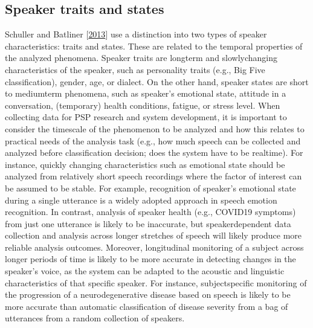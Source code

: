 \documentclass[letterpaper,10pt,english]{jupyterBook}
\begin{document}
\subsection{Speaker traits and states}
\label{\detokenize{Recognition/Paralinguistic_speech_processing:speaker-traits-and-states}}
\sphinxAtStartPar
Schuller and Batliner {[}\hyperlink{cite.References:id8}{2013}{]}
use a distinction into two types of speaker
characteristics: traits and states. These are related to the temporal
properties of the analyzed phenomena. Speaker traits are long\sphinxhyphen{}term and
slowly\sphinxhyphen{}changing characteristics of the speaker, such as personality
traits (e.g., Big Five classification), gender, age, or dialect. On the
other hand, speaker states are short\sphinxhyphen{} to medium\sphinxhyphen{}term phenomena, such as
speaker’s emotional state, attitude in a conversation, (temporary)
health conditions, fatigue, or stress level. When collecting data for
PSP research and system development, it is important to consider the
time\sphinxhyphen{}scale of the phenomenon to be analyzed and how this relates to
practical needs of the analysis task (e.g., how much speech can be
collected and analyzed before classification decision; does the system
have to be real\sphinxhyphen{}time). For instance, quickly changing characteristics
such as emotional state should be analyzed from relatively short speech
recordings where the factor of interest can be assumed to be stable. For
example, recognition of speaker’s emotional state during a single
utterance is a widely adopted approach in speech emotion recognition. In
contrast, analysis of speaker health (e.g., COVID\sphinxhyphen{}19 symptoms) from just
one utterance is likely to be inaccurate, but speaker\sphinxhyphen{}dependent data
collection and analysis across longer stretches of speech will likely
produce more reliable analysis outcomes. Moreover, longitudinal
monitoring of a subject across longer periods of time is likely to be
more accurate in detecting changes in the speaker’s voice, as the system
can be adapted to the acoustic and linguistic characteristics of that
specific speaker. For instance, subject\sphinxhyphen{}specific monitoring of the
progression of a neurodegenerative disease based on speech is likely to
be more accurate than automatic classification of disease severity from
a bag of utterances from a random collection of speakers.
\end{document}
